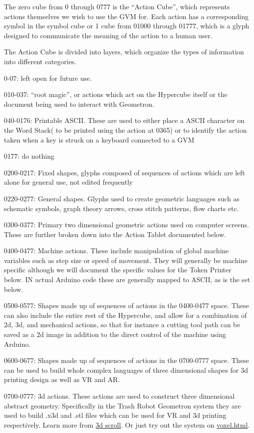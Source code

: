The zero cube from 0 through 0777 is the ``Action Cube'', which
represents actions themselves we wish to use the GVM for. Each action
has a corresponding symbol in the symbol cube or 1 cube from 01000
through 01777, which is a glyph designed to communicate the meaning of
the action to a human user.

The Action Cube is divided into layers, which organize the types of
information into different categories.

0-07: left open for future use.

010-037: ``root magic'', or actions which act on the Hypercube itself or
the document being used to interact with Geometron.

040-0176: Printable ASCII. These are used to either place a ASCII
character on the Word Stack( to be printed using the action at 0365) or
to identify the action taken when a key is struck on a keyboard
connected to a GVM

0177: do nothing

0200-0217: Fixed shapes, glyphs composed of sequences of actions which
are left alone for general use, not edited frequently

0220-0277: General shapes. Glyphs used to create geometric languages
such as schematic symbols, graph theory arrows, cross stitch patterns,
flow charts etc.

0300-0377: Primary two dimensional geometric actions used on computer
screens. These are further broken down into the Action Tablet documented
below.

0400-0477: Machine actions. These include manipulation of global machine
variables such as step size or speed of movement. They will generally be
machine specific although we will document the specific values for the
Token Printer below. IN actual Arduino code these are generally mapped
to ASCII, as is the set below.

0500-0577: Shapes made up of sequences of actions in the 0400-0477
space. These can also include the entire rest of the Hypercube, and
allow for a combination of 2d, 3d, and mechanical actions, so that for
instance a cutting tool path can be saved as a 2d image in addition to
the direct control of the machine using Arduino.

0600-0677: Shapes made up of sequences of actions in the 0700-0777
space. These can be used to build whole complex languages of three
dimensional shapes for 3d printing design as well as VR and AR.

0700-0777: 3d actions. These actions are used to construct three
dimensional abstract geometry. Specifically in the Trash Robot Geometron
system they are used to build .x3d and .stl files which can be used for
VR and 3d printing respectively. Learn more from
\href{scrolls/geometron3d}{3d scroll}. Or just try out the system on
\url{voxel.html}.

